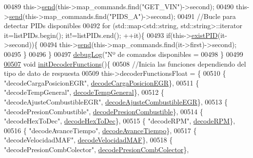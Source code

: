 \begin{DoxyCode}
{{{{{{{{{{{{{00489         this->\hyperlink{classObd_a453591bc9a280e8d44d82025ce8590e9}{send}(this->map\_commands.find(\textcolor{stringliteral}{"GET\_VIN"})->second);
00490         this->\hyperlink{classObd_a453591bc9a280e8d44d82025ce8590e9}{send}(this->map\_commands.find(\textcolor{stringliteral}{"PIDS\_A"})->second);
00491         \textcolor{comment}{//Bucle para detectar PIDs disponibles}
00492         \textcolor{keywordflow}{for} (std::map<std::string, std::string>::iterator it=listPIDs.begin(); it!=listPIDs.end(); ++it)\{
00493             \textcolor{keywordflow}{if}(this->\hyperlink{classObd_aeff55ecb0a0a4278a22f20db3d2e17e3}{existPID}(it->second))\{
00494                 this->\hyperlink{classObd_a453591bc9a280e8d44d82025ce8590e9}{send}(this->map\_commands.find(it->first)->second); 
00495             \}
00496         \}
00497         \hyperlink{debug_8hpp_a55f41cf7b0585224496de3d7adbc101c}{debugLog}(\textcolor{stringliteral}{"Nº de comandos disponibles = %
00498     \}
00499 
\hyperlink{classObd_a560631b2e3af0a72c063f915a11e0466}{00507}     \textcolor{keywordtype}{void} \hyperlink{classObd_a560631b2e3af0a72c063f915a11e0466}{initDecoderFunctions}()\{
00508     \textcolor{comment}{//Inicia las funciones dependiendo del tipo de dato de respuesta    }
00509     this->decoderFunctionsFloat = \{
00510             \{ \textcolor{stringliteral}{"decodeCargaPosicionEGR"}, \hyperlink{decoders_8cpp_adbe68794075963c37e654d53b8a46f68}{decodeCargaPosicionEGR}\},
00511             \{ \textcolor{stringliteral}{"decodeTempGeneral"}, \hyperlink{decoders_8cpp_af581438645d7ff67766fa2e5eba5eaf9}{decodeTempGeneral}\},
00512             \{ \textcolor{stringliteral}{"decodeAjusteCombustibleEGR"}, \hyperlink{decoders_8cpp_aeee9e6d8511a934b3a3644b19de3f2b7}{decodeAjusteCombustibleEGR}\},
00513             \{ \textcolor{stringliteral}{"decodePresionCombustible"}, \hyperlink{decoders_8cpp_ab1c03e72734d4127a1c48f3b5a44a2e2}{decodePresionCombustible}\},
00514             \{ \textcolor{stringliteral}{"decodeHexToDec"}, \hyperlink{decoders_8cpp_aa7c5243702d5462e4b638450e750624e}{decodeHexToDec}\},
00515             \{ \textcolor{stringliteral}{"decodeRPM"}, \hyperlink{decoders_8cpp_a889868c7b1e554aee496e6aed7101cc4}{decodeRPM}\},
00516             \{ \textcolor{stringliteral}{"decodeAvanceTiempo"}, \hyperlink{decoders_8cpp_a7a2fee87eace8ad6c86c628f5f91b3b5}{decodeAvanceTiempo}\},
00517             \{ \textcolor{stringliteral}{"decodeVelocidadMAF"}, \hyperlink{decoders_8cpp_adceefeb78a70b295b378f4c472630aa1}{decodeVelocidadMAF}\},
00518             \{ \textcolor{stringliteral}{"decodePresionCombColector"}, \hyperlink{decoders_8cpp_a3e32aaf8ced989570e141f01210564f3}{decodePresionCombColector}\},
}}}}}}}}}}}}}}
\end{DoxyCode}
